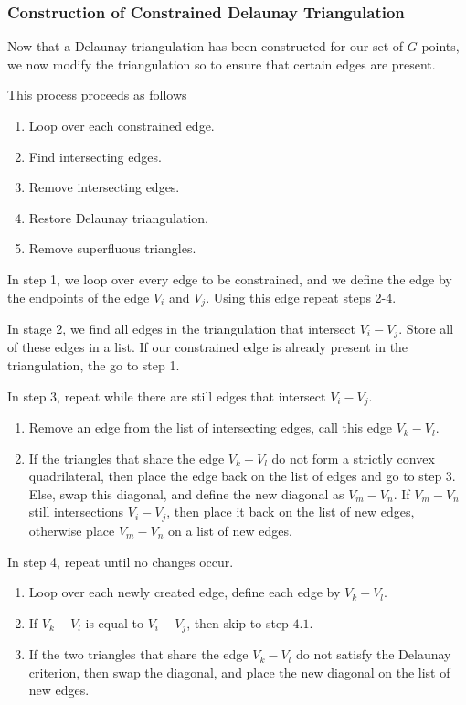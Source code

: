\documentclass[../fem.tex]{subfiles}
\begin{document}
\subsubsection{Construction of Constrained Delaunay Triangulation}%
\label{ssub:construction_of_constrained_delaunay_triangulation}

Now that a Delaunay triangulation has been constructed for our set of $G$
points, we now modify the triangulation so to ensure that certain edges are
present.

This process proceeds as follows

\begin{enumerate}[label=\arabic*.]
  \item Loop over each constrained edge.
  \item Find intersecting edges.
  \item Remove intersecting edges.
  \item Restore Delaunay triangulation.
  \item Remove superfluous triangles.
\end{enumerate}

In step 1, we loop over every edge to be constrained, and we define the edge by
the endpoints of the edge $V_i$ and $V_j$. Using this edge repeat steps 2-4.

In stage 2, we find all edges in the triangulation that intersect $V_i-V_j$.
Store all of these edges in a list. If our constrained edge is already present
in the triangulation, the go to step 1.

In step 3, repeat while there are still edges that intersect $V_i-V_j$.
\begin{enumerate}[label=3.\arabic*.]
  \item Remove an edge from the list of intersecting edges, call this edge
    $V_k-V_l$.
  \item If the triangles that share the edge $V_k-V_l$ do not form a strictly
    convex quadrilateral, then place the edge back on the list of edges and go
    to step 3. Else, swap this diagonal, and define the new diagonal as
    $V_m-V_n$. If $V_m-V_n$ still intersections $V_i-V_j$, then place it back
    on the list of new edges, otherwise place $V_m-V_n$ on a list of new edges.
\end{enumerate}

In step 4, repeat until no changes occur.
\begin{enumerate}[label=4.\arabic*.]
  \item Loop over each newly created edge, define each edge by $V_k-V_l$.
  \item If $V_k-V_l$ is equal to $V_i-V_j$, then skip to step $4.1$.
  \item If the two triangles that share the edge $V_k-V_l$ do not satisfy the
    Delaunay criterion, then swap the diagonal, and place the new diagonal on
    the list of new edges.
\end{enumerate}
\end{document}
